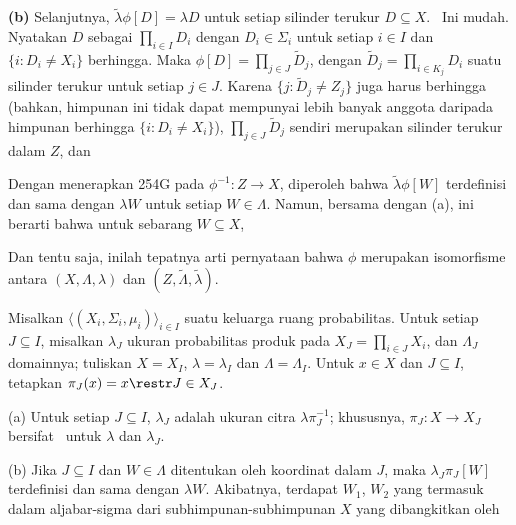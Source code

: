 {{\bf (b)} Selanjutnya, $\tilde\lambda\phi[D]=\lambda D$ untuk setiap silinder terukur
$D\subseteq X$.   \Prf\ Ini mudah.   Nyatakan $D$ sebagai
$\prod_{i\in I}D_i$ dengan $D_i\in\Sigma_i$ untuk setiap $i\in I$ dan
$\{i:D_i\ne X_i\}$ berhingga.   Maka $\phi[D]=\prod_{j\in J}\tilde
D_j$, dengan $\tilde D_j=\prod_{i\in K_j}D_i$ suatu silinder terukur
untuk setiap $j\in J$.   Karena $\{j:\tilde D_j\ne Z_j\}$ juga harus
berhingga (bahkan, himpunan ini tidak dapat mempunyai lebih banyak anggota daripada himpunan berhingga
$\{i:D_i\ne X_i\}$), $\prod_{j\in J}\tilde D_j$ sendiri merupakan silinder terukur
dalam $Z$, dan


Dengan menerapkan 254G pada $\phi^{-1}:Z\to X$, diperoleh bahwa
$\tilde\lambda\phi[W]$ terdefinisi dan sama dengan $\lambda W$ untuk setiap
$W\in\Lambda$.   Namun, bersama dengan (a), ini berarti bahwa
untuk sebarang $W\subseteq X$,



\noindent Dan tentu saja, inilah tepatnya arti pernyataan bahwa $\phi$
merupakan isomorfisme antara $(X,\Lambda,\lambda)$ dan
$(Z,\tilde\Lambda,\tilde\lambda)$.
}%

 Misalkan
$\langle(X_i,\Sigma_i,\mu_i)\rangle_{i\in I}$ suatu keluarga ruang probabilitas.
Untuk setiap $J\subseteq I$, misalkan
$\lambda_J$ ukuran probabilitas produk pada
$X_J=\prod_{i\in J}X_i$, dan $\Lambda_J$ domainnya;  tuliskan $X=X_I$,
$\lambda=\lambda_I$ dan $\Lambda=\Lambda_I$.   Untuk $x\in X$ dan
$J\subseteq I$, tetapkan $\pi_J(x)=x\restr J\in X_J$.

(a) Untuk setiap $J\subseteq I$, $\lambda_J$ adalah ukuran citra
$\lambda\pi_J^{-1}$;  khususnya,
$\pi_J:X\to X_J$ bersifat \imp\ untuk $\lambda$
dan $\lambda_J$.

(b) Jika $J\subseteq I$ dan $W\in\Lambda$
ditentukan oleh koordinat dalam $J$, maka
$\lambda_J\pi_J[W]$ terdefinisi dan sama dengan $\lambda W$.   Akibatnya,
terdapat $W_1$, $W_2$ yang termasuk dalam aljabar-sigma dari subhimpunan-subhimpunan
$X$ yang dibangkitkan oleh


